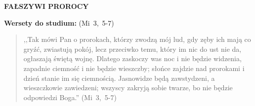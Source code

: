\documentclass[10pt,a4paper,oneside]{article}
\begin{document}
\centerline{\textbf{\MakeUppercase{Fałszywi prorocy}}}
\begin{center}
\textbf{Wersety do studium:} (Mi~3,~5-7)
\end{center}
\begin{quote}
,,Tak mówi Pan o prorokach, którzy zwodzą mój lud, gdy zęby ich mają co gryźć, zwiastują pokój, lecz przeciwko temu, który im nic do ust nie da, ogłaszają świętą wojnę. Dlatego zaskoczy was noc i nie będzie widzenia, zapadnie ciemność i nie będzie wieszczby; słońce zajdzie nad prorokami i dzień stanie im się ciemnością. Jasnowidze będą zawstydzeni, a wieszczkowie zawiedzeni; wszyscy zakryją sobie twarze, bo nie będzie odpowiedzi Boga.'' (Mi~3,~5-7)
\end{quote}
\end{document}
